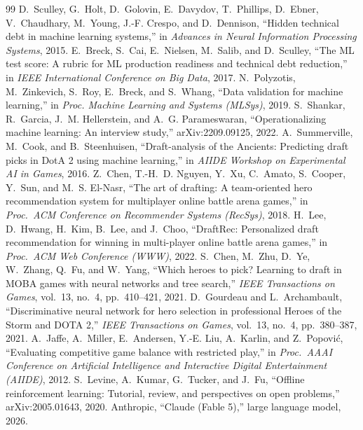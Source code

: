 \documentclass[journal]{IEEEtran}
\begin{document}
\begin{thebibliography}{99}
 D.~Sculley, G.~Holt, D.~Golovin, E.~Davydov,
T.~Phillips, D.~Ebner, V.~Chaudhary, M.~Young, J.-F. Crespo, and
D.~Dennison, ``Hidden technical debt in machine learning systems,'' in
\emph{Advances in Neural Information Processing Systems}, 2015.
 E.~Breck, S.~Cai, E.~Nielsen, M.~Salib, and
D.~Sculley, ``The ML test score: A rubric for ML production readiness
and technical debt reduction,'' in \emph{IEEE International Conference
on Big Data}, 2017.
 N.~Polyzotis, M.~Zinkevich, S.~Roy,
E.~Breck, and S.~Whang, ``Data validation for machine learning,'' in
\emph{Proc. Machine Learning and Systems (MLSys)}, 2019.
 S.~Shankar, R.~Garcia, J.~M.
Hellerstein, and A.~G. Parameswaran, ``Operationalizing machine
learning: An interview study,'' arXiv:2209.09125, 2022.
 A.~Summerville, M.~Cook, and
B.~Steenhuisen, ``Draft-analysis of the Ancients: Predicting draft
picks in DotA 2 using machine learning,'' in \emph{AIIDE Workshop on
Experimental AI in Games}, 2016.
 Z.~Chen, T.-H.~D. Nguyen, Y.~Xu, C.~Amato,
S.~Cooper, Y.~Sun, and M.~S. El-Nasr, ``The art of drafting: A
team-oriented hero recommendation system for multiplayer online battle
arena games,'' in \emph{Proc.\ ACM Conference on Recommender Systems
(RecSys)}, 2018.
 H.~Lee, D.~Hwang, H.~Kim, B.~Lee, and J.~Choo,
``DraftRec: Personalized draft recommendation for winning in
multi-player online battle arena games,'' in \emph{Proc.\ ACM Web
Conference (WWW)}, 2022.
 S.~Chen, M.~Zhu, D.~Ye, W.~Zhang, Q.~Fu,
and W.~Yang, ``Which heroes to pick? Learning to draft in MOBA games
with neural networks and tree search,'' \emph{IEEE Transactions on
Games}, vol.~13, no.~4, pp.~410--421, 2021.
 D.~Gourdeau and L.~Archambault,
``Discriminative neural network for hero selection in professional
Heroes of the Storm and DOTA 2,'' \emph{IEEE Transactions on Games},
vol.~13, no.~4, pp.~380--387, 2021.
 A.~Jaffe, A.~Miller, E.~Andersen, Y.-E.
Liu, A.~Karlin, and Z.~Popovi\'c, ``Evaluating competitive game balance
with restricted play,'' in \emph{Proc.\ AAAI Conference on Artificial
Intelligence and Interactive Digital Entertainment (AIIDE)}, 2012.
 S.~Levine, A.~Kumar, G.~Tucker, and J.~Fu,
``Offline reinforcement learning: Tutorial, review, and perspectives on
open problems,'' arXiv:2005.01643, 2020.
 Anthropic, ``Claude (Fable 5),'' large language model,
2026.
\end{thebibliography}
\end{document}
